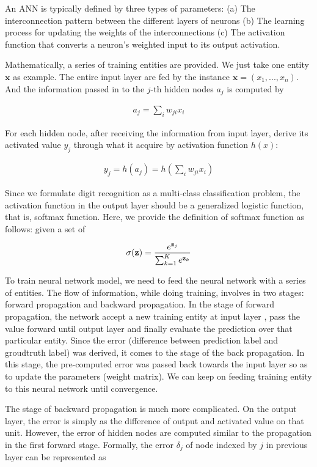 \documentclass{article} %
\begin{document}
An ANN is typically defined by three types of parameters: (a) The
interconnection pattern between the different layers of neurons (b) The learning
process for updating the weights of the interconnections (c) The activation
function that converts a neuron's weighted input to its output activation.

Mathematically, a series of training entities are provided. We just take one
entity $\mathbf{x}$ as example. The entire input layer are fed by the instance
$\mathbf{x} = (x_1, ..., x_n)$. And the information passed in to the $j$-th
hidden nodes $a_j$ is computed by 

\begin{align}
    a_j = \sum_{i} w_{ji} x_i 
\end{align}

For each hidden node, after receiving the information from input layer,
derive its activated value $y_j$ through what it acquire by activation function $h(x)$:

\begin{align}
   y_j = h(a_j) = h(\sum_{i} w_{ji} x_i)    
\end{align}

Since we formulate digit recognition as a multi-class classification problem,
the activation function in the output layer should be a generalized logistic
function, that is, softmax function. Here, we provide the definition of
softmax function as follows: given a set of 

\begin{align}
    \sigma({\bf z}) = \frac{e^{{\bf z}_j}}{\sum_{k=1}^{K} e^{{\bf z}_k}}
\end{align}

To train neural network model, we need to feed the neural network with a
series of entities. The flow of information, while doing training,
involves in two stages: forward propagation and backward propagation.  In the
stage of forward propagation, the network accept a new training entity at input layer
, pass the value forward until output layer and finally evaluate the
prediction over that particular entity. Since the error (difference
between prediction label and groudtruth label) was derived, it comes to the
stage of the back propagation. In this stage, the pre-computed error was
passed back towards the input layer so as to update the parameters (weight
matrix). We can keep on feeding training entity to this neural network until
convergence.

The stage of backward propagation is much more complicated. On the output
layer, the error is simply as the difference of output and activated value on
that unit. However, the error of hidden nodes are computed similar to the
propagation in the first forward stage. Formally, the error $\delta_j$ of node indexed by
$j$ in previous layer can be represented as 
\end{document}
